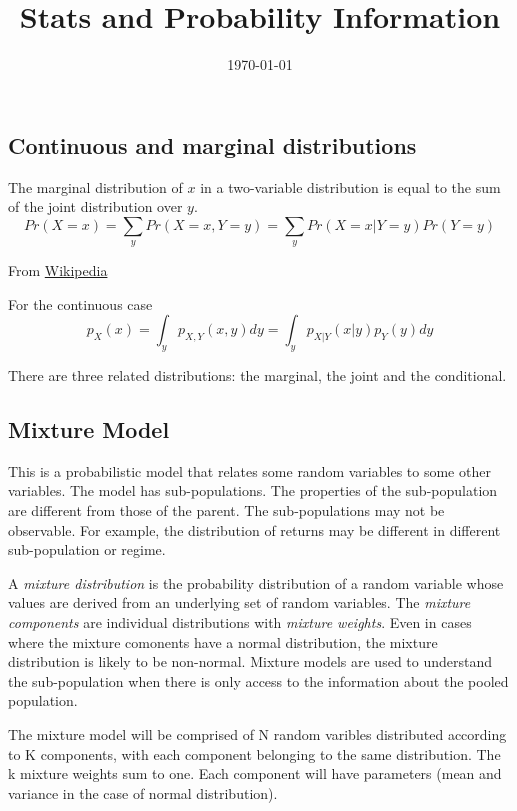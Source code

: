 \documentclass[12pt, a4paper, oneside]{article}\usepackage[]{graphicx}\usepackage[]{color}
\begin{document}
\title{Stats and Probability Information}
\date{\today}
\maketitle
\subsection*{Continuous and marginal distributions}

The marginal distribution of $x$ in a two-variable distribution is equal to the sum of the joint distribution over $y$. 
\begin{equation}
Pr(X = x) = \sum_y Pr(X = x, Y = y) = \sum_y Pr(X = x|Y = y)Pr(Y = y)
\end{equation}

From \href{http://en.wikipedia.org/wiki/Marginal_distribution}{Wikipedia}

For the continuous case
\begin{equation}
p_X(x) = \int_y p_{X,Y}(x,y)dy = \int_y p_{X|Y}(x|y)p_Y(y)dy
\end{equation}

There are three related distributions:  the marginal, the joint and the conditional. 

\subsection{Mixture Model}
This is a probabilistic model that relates some random variables to some other variables.  The model has sub-populations. The properties of the sub-population are different from those of the parent. The sub-populations may not be observable.  For example, the distribution of returns may be different in different sub-population or regime. 

A \emph{mixture distribution} is the probability distribution of a random variable  whose values are derived from an underlying set of random variables. The \emph{mixture components} are individual distributions with \emph{mixture weights}.  Even in cases where the mixture comonents have a normal distribution, the mixture distribution is likely to be non-normal. Mixture models are used to understand the sub-population when there is only access to the information about the pooled population. 

The mixture model will be comprised of N random varibles distributed according to K components, with each component belonging to the same distribution. The k mixture weights sum to one. Each component will have parameters (mean and variance in the case of normal distribution).  
\end{document}
